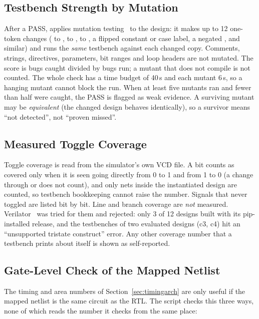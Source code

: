 \subsection{Testbench Strength by Mutation}
\label{sec:strength}
After a PASS,  applies mutation testing~\cite{demillo} to the
design: it makes up to 12 one-token changes (\code{+} to \code{-}, \code{&} to
\code{|}, \code{==} to \code{!=}, a flipped constant or case label, a negated
, and similar) and runs the \emph{same} testbench against each changed copy.
Comments, strings, directives, parameters, bit ranges and loop headers are not mutated. The score
is bugs caught divided by bugs run; a mutant that does not compile is not counted.
The whole check has a time budget of 40\,s and each mutant 6\,s, so a hanging mutant
cannot block the run. When at least five mutants ran and fewer than half were caught,
the PASS is flagged as weak evidence. A surviving mutant may be \emph{equivalent}
(the changed design behaves identically), so a survivor means ``not detected'', not
``proven missed''.

\subsection{Measured Toggle Coverage}
Toggle coverage is read from the simulator's own VCD file. A bit counts as covered
only when it is seen going directly from 0 to 1 and from 1 to 0 (a change through
 or  does not count), and only nets inside the instantiated design
are counted, so testbench bookkeeping cannot raise the number. Signals that never
toggled are listed bit by bit. Line and branch coverage are \emph{not} measured.
Verilator~\cite{verilator} was tried for them and rejected: only 3 of 12 designs built
with its pip-installed release, and the testbenches of two evaluated designs (c3, c4)
hit an ``unsupported tristate construct'' error. Any other coverage number that a
testbench prints about itself is shown as self-reported.

\subsection{Gate-Level Check of the Mapped Netlist}
\label{sec:gatelevel}
The timing and area numbers of Section~\ref{sec:timingarch} are only useful if the
mapped netlist is the same circuit as the RTL. The script
 checks this three ways, none of which reads the number
it checks from the same place:

